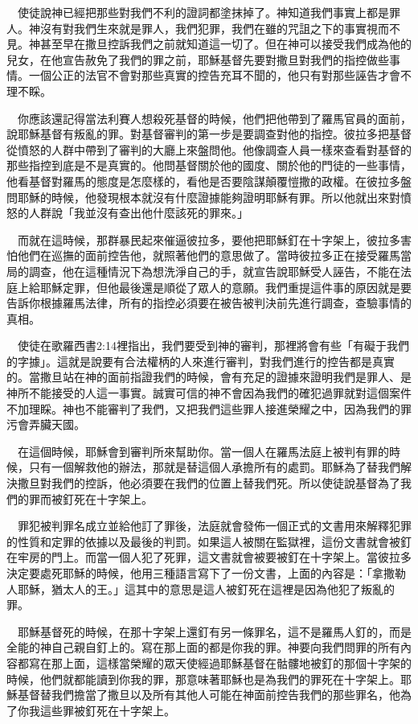 \documentclass{book}
\begin{document}
　使徒說神已經把那些對我們不利的證詞都塗抹掉了。神知道我們事實上都是罪人。神沒有對我們生來就是罪人，我們犯罪，我們在雖的咒詛之下的事實視而不見。神甚至早在撒旦控訴我們之前就知道這一切了。但在神可以接受我們成為他的兒女，在他宣告赦免了我們的罪之前，耶穌基督先要對撒旦對我們的指控做些事情。一個公正的法官不會對那些真實的控告充耳不聞的，他只有對那些誣告才會不理不睬。

　你應該還記得當法利賽人想殺死基督的時候，他們把他帶到了羅馬官員的面前，說耶穌基督有叛亂的罪。對基督審判的第一步是要調查對他的指控。彼拉多把基督從憤怒的人群中帶到了審判的大廳上來盤問他。他像調查人員一樣來查看對基督的那些指控到底是不是真實的。他問基督關於他的國度、關於他的門徒的一些事情，他看基督對羅馬的態度是怎麼樣的，看他是否要陰謀顛覆愷撒的政權。在彼拉多盤問耶穌的時候，他發現根本就沒有什麼證據能夠證明耶穌有罪。所以他就出來對憤怒的人群說「我並沒有查出他什麼該死的罪來。」

　而就在這時候，那群暴民起來催逼彼拉多，要他把耶穌釘在十字架上，彼拉多害怕他們在巡撫的面前控告他，就照著他們的意思做了。當時彼拉多正在接受羅馬當局的調查，他在這種情況下為想洗淨自己的手，就宣告說耶穌受人誣告，不能在法庭上給耶穌定罪，但他最後還是順從了眾人的意願。我們重提這件事的原因就是要告訴你根據羅馬法律，所有的指控必須要在被告被判決前先進行調查，查驗事情的真相。

　使徒在歌羅西書2:14裡指出，我們要受到神的審判，那裡將會有些「有礙于我們的字據」。這就是說要有合法權柄的人來進行審判，對我們進行的控告都是真實的。當撒旦站在神的面前指證我們的時候，會有充足的證據來證明我們是罪人、是神所不能接受的人這一事實。誠實可信的神不會因為我們的確犯過罪就對這個案件不加理睬。神也不能審判了我們，又把我們這些罪人接進榮耀之中，因為我們的罪污會弄臟天國。

　在這個時候，耶穌會到審判所來幫助你。當一個人在羅馬法庭上被判有罪的時候，只有一個解救他的辦法，那就是替這個人承擔所有的處罰。耶穌為了替我們解決撒旦對我們的控訴，他必須要在我們的位置上替我們死。所以使徒說基督為了我們的罪而被釘死在十字架上。

　罪犯被判罪名成立並給他訂了罪後，法庭就會發佈一個正式的文書用來解釋犯罪的性質和定罪的依據以及最後的判罰。如果這人被關在監獄裡，這份文書就會被釘在牢房的門上。而當一個人犯了死罪，這文書就會被要被釘在十字架上。當彼拉多決定要處死耶穌的時候，他用三種語言寫下了一份文書，上面的內容是：「拿撒勒人耶穌，猶太人的王。」這其中的意思是這人被釘死在這裡是因為他犯了叛亂的罪。

　耶穌基督死的時候，在那十字架上還釘有另一條罪名，這不是羅馬人釘的，而是全能的神自己親自釘上的。寫在那上面的都是你我的罪。神要向我們問罪的所有內容都寫在那上面，這樣當榮耀的眾天使經過耶穌基督在骷髏地被釘的那個十字架的時候，他們就都能讀到你我的罪，那意味著耶穌也是為我們的罪死在十字架上。耶穌基督替我們擔當了撒旦以及所有其他人可能在神面前控告我們的那些罪名，他為了你我這些罪被釘死在十字架上。
\end{document}
